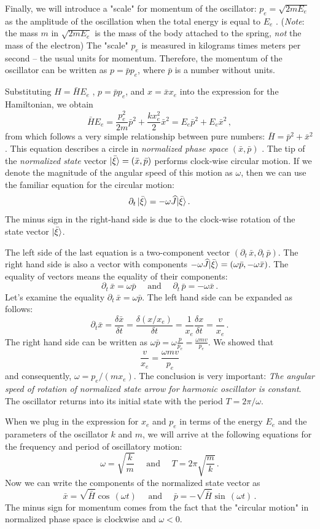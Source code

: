 Finally,  we will introduce a "scale" for momentum of the oscillator: $p_e=\sqrt{2mE_e}$ as the amplitude of the oscillation when the total energy is equal to $E_e$ . (\emph{Note}: the mass $m$  in $\sqrt{2mE_e}$ is the mass of the body attached to the spring, \emph{not} the mass of the electron) The "scale" $p_e$  is measured in kilograms times meters per second -- the usual units for momentum. Therefore, the momentum of the oscillator can be written as $p=\bar{p}p_e$, where $\bar{p}$ is a number without units. 

Substituting $H=\bar{H}E_e$ , $p=\bar{p}p_e$, and $x=\bar{x}x_e$  into the expression for the Hamiltonian, we obtain
\[
\bar{H}E_e=\frac{p_e^2}{2m}\bar{p}^2+\frac{kx_e^2}{2}\bar{x}^2=E_e\bar{p}^2+E_e\bar{x}^2\,,
\]
from which follows a very simple relationship between pure numbers: $\bar{H}=\bar{p}^2+\bar{x}^2$. This equation describes a circle in \emph{normalized phase space} $(\bar{x}, \bar{p})$ . The tip of the \emph{normalized state} vector $|{\bar{\xi}}\rangle=(\bar{x}, \bar{p})$ performs clock-wise circular motion. If we denote the magnitude of the angular speed of this motion as $\omega$, then we can use the familiar equation for the circular motion:
\[
\partial_t\,|{\bar{\xi}}\rangle = -\omega\widehat{J}|{\bar{\xi}}\rangle\,.
\]
The minus sign in the right-hand side is due to the clock-wise rotation of the state vector $|{\bar{\xi}}\rangle$.

The left side of the last equation is a two-component vector $(\partial_t\,\bar{x}, \partial_t\,\bar{p})$. The right hand side is also a vector with components $-\omega\widehat{J}|{\bar{\xi}}\rangle=(\omega\bar{p}, -\omega\bar{x})$. The equality of vectors means the equality of their components: 
\[
\partial_t\,\bar{x}=\omega\bar{p}\quad\textrm{ and }\quad\partial_t\,\bar{p}=-\omega\bar{x}\,.
\]
Let’s examine the equality $\partial_t\,\bar{x}=\omega\bar{p}$. The left hand side can be expanded as follows: 
\[
\partial_t \bar{x}=\frac{\delta \bar{x}}{\delta t}=\frac{\delta (x/x_e)}{\delta t}=\frac{1}{x_e}\frac{\delta x}{\delta t}=\frac{v}{x_e}\,.
\]
The right hand side can be written as $\omega \bar{p}=\omega\frac{p}{p_e}=\frac{\omega m v}{p_e}$. We showed that 
\[
\frac{v}{x_e}=\frac{\omega m v}{p_e}
\]
and consequently, $\omega = p_e/(mx_e)$. The conclusion is very important: \emph{The angular speed of rotation of normalized state arrow  for harmonic oscillator is constant}. The oscillator returns into its initial state with the period $T=2\pi/\omega$.

When we plug in the expression for $x_e$ and $p_e$ in terms of the energy $E_e$ and the parameters of the oscillator $k$ and $m$, we will arrive at the following equations for the frequency and period of oscillatory motion:
\[
\omega=\sqrt{\frac{k}{m}}\quad\textrm{ and }\quad T=2\pi\sqrt{\frac{m}{k}}\,.
\]
Now we can write the components of the normalized state vector as
\[
\bar{x}=\sqrt{\bar{H}}\cos\,(\omega t)\quad\textrm{ and }\quad \bar{p}=-\sqrt{\bar{H}}\sin\,(\omega t)\,.
\]
The minus sign for momentum comes from the fact that the "circular motion" in normalized phase space is clockwise and $\omega < 0$.

